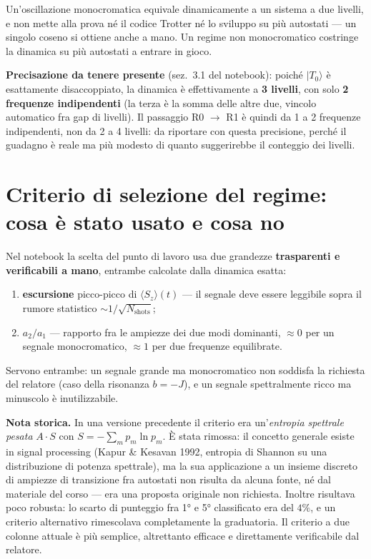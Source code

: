 \documentclass[11pt,a4paper]{article}
\begin{document}
Un'oscillazione monocromatica equivale dinamicamente a un sistema a due
livelli, e non mette alla prova né il codice Trotter né lo sviluppo su
più autostati --- un singolo coseno si ottiene anche a mano. Un regime
non monocromatico costringe la dinamica su più autostati a entrare in
gioco.

\begin{editnote}
\textbf{Precisazione da tenere presente} (sez.~3.1 del notebook):
poiché $|T_0\rangle$ è esattamente disaccoppiato, la dinamica è
effettivamente a \textbf{3 livelli}, con solo \textbf{2 frequenze
indipendenti} (la terza è la somma delle altre due, vincolo automatico
fra gap di livelli). Il passaggio R0 $\to$ R1 è quindi da 1 a 2
frequenze indipendenti, non da 2 a 4 livelli: da riportare con questa
precisione, perché il guadagno è reale ma più modesto di quanto
suggerirebbe il conteggio dei livelli.
\end{editnote}

\section{Criterio di selezione del regime: cosa è stato usato e cosa no}

Nel notebook la scelta del punto di lavoro usa due grandezze
\textbf{trasparenti e verificabili a mano}, entrambe calcolate dalla
dinamica esatta:

\begin{enumerate}[leftmargin=1.4em,itemsep=0.2em]
\item \textbf{escursione} picco-picco di $\langle S_z\rangle(t)$ --- il
segnale deve essere leggibile sopra il rumore statistico
$\sim1/\sqrt{N_\text{shots}}$;
\item \textbf{$a_2/a_1$} --- rapporto fra le ampiezze dei due modi
dominanti, $\approx0$ per un segnale monocromatico, $\approx1$ per due
frequenze equilibrate.
\end{enumerate}

Servono entrambe: un segnale grande ma monocromatico non soddisfa la
richiesta del relatore (caso della risonanza $b=-J$), e un segnale
spettralmente ricco ma minuscolo è inutilizzabile.

\begin{editnote}
\textbf{Nota storica.} In una versione precedente il criterio era
un'\emph{entropia spettrale pesata} $A\cdot S$ con
$S=-\sum_m p_m\ln p_m$. È stata rimossa: il concetto generale esiste in
signal processing (Kapur \& Kesavan 1992, entropia di Shannon su una
distribuzione di potenza spettrale), ma la sua applicazione a un
insieme discreto di ampiezze di transizione fra autostati non risulta
da alcuna fonte, né dal materiale del corso --- era una proposta
originale non richiesta. Inoltre risultava poco robusta: lo scarto di
punteggio fra 1° e 5° classificato era del $4\%$, e un criterio
alternativo rimescolava completamente la graduatoria. Il criterio a due
colonne attuale è più semplice, altrettanto efficace e direttamente
verificabile dal relatore.
\end{editnote}
\end{document}
